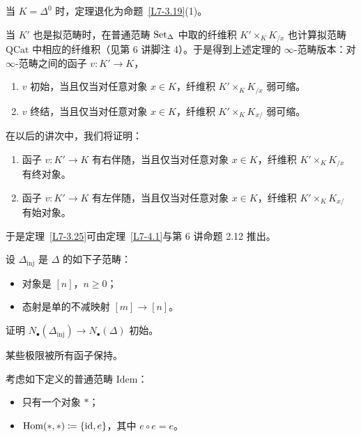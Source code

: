 \begin{remark}\label{L7-4.3}
当 $K=\Delta^0$ 时，定理退化为命题~\ref{L7-3.19}(1)。
\end{remark}

\begin{remark}\label{L7-4.4}
当 $K'$ 也是拟范畴时，在普通范畴 $\operatorname{Set}_\Delta$ 中取的纤维积 $K'\times_K K_{/x}$ 也计算拟范畴 $\mathrm{QCat}$ 中相应的纤维积（见第 6 讲脚注 4）。于是得到上述定理的 $\infty$-范畴版本：对 $\infty$-范畴之间的函子 $v\colon K'\to K$，
\begin{enumerate}[label=(\arabic*),leftmargin=2.4em,itemsep=0.1em]
\item $v$ 初始，当且仅当对任意对象 $x\in K$，纤维积 $K'\times_K K_{/x}$ 弱可缩。
\item $v$ 终结，当且仅当对任意对象 $x\in K$，纤维积 $K'\times_K K_{x/}$ 弱可缩。
\end{enumerate}
\end{remark}

\begin{remark}\label{L7-4.5}
在以后的讲次中，我们将证明：
\begin{enumerate}[label=(\arabic*),leftmargin=2.4em,itemsep=0.1em]
\item 函子 $v\colon K'\to K$ 有右伴随，当且仅当对任意对象 $x\in K$，纤维积 $K'\times_K K_{/x}$ 有终对象。
\item 函子 $v\colon K'\to K$ 有左伴随，当且仅当对任意对象 $x\in K$，纤维积 $K'\times_K K_{x/}$ 有始对象。
\end{enumerate}
\end{remark}

于是定理~\ref{L7-3.25}可由定理~\ref{L7-4.1}与第 6 讲命题 2.12 推出。

\begin{exercise}\label{L7-4.6}
设 $\Delta_{\mathrm{inj}}$ 是 $\Delta$ 的如下子范畴：
\begin{itemize}[leftmargin=2.2em,itemsep=0.1em]
\item 对象是 $[n]$，$n\ge 0$；
\item 态射是单的不减映射 $[m]\to[n]$。
\end{itemize}
证明 $N_{\bullet}(\Delta_{\mathrm{inj}})\to N_{\bullet}(\Delta)$ 初始。
\end{exercise}


\nitem\label{L7-A.1} 某些极限被所有函子保持。

\begin{construction}\label{L7-A.2}
考虑如下定义的普通范畴 $\mathrm{Idem}$：
\begin{itemize}[leftmargin=2.2em,itemsep=0.1em]
\item 只有一个对象 $\ast$；
\item $\operatorname{Hom}(\ast,\ast)\coloneqq\{\operatorname{id},e\}$，其中 $e\circ e=e$。
\end{itemize}
\end{construction}

